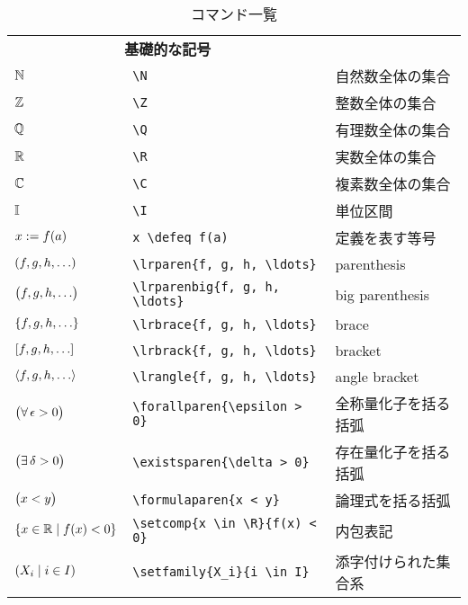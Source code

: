 \documentclass[uplatex, dvipdfmx, a4paper, 12pt, class=jsarticle, crop=false]{standalone}
\begin{document}
\newcommand{\tablesubtitle}[1]{\multicolumn{2}{c}{\textbf{#1}}}

\begin{table}[htb]
	\centering
	\renewcommand{\arraystretch}{0.9}
	\caption{コマンド一覧}
	\begin{tabular}{ll@{\qquad}l}
		\hline
		\hline

		\tablesubtitle{基礎的な記号} \\
		$\mathbb{N}$ & \verb|\N| & 自然数全体の集合 \\
		$\mathbb{Z}$ & \verb|\Z| & 整数全体の集合   \\
		$\mathbb{Q}$ & \verb|\Q| & 有理数全体の集合 \\
		$\mathbb{R}$ & \verb|\R| & 実数全体の集合   \\
		$\mathbb{C}$ & \verb|\C| & 複素数全体の集合 \\
		$\mathbb{I}$ & \verb|\I| & 単位区間         \\
		$x \mathrel{:=} f(a)$ & \verb|x \defeq f(a)| & 定義を表す等号 \\
		$\lrparen{f, g, h, \ldots}$    & \verb|\lrparen{f, g, h, \ldots}|    & parenthesis          \\
		$\bigl({f, g, h, \ldots}\bigr)$ & \verb|\lrparenbig{f, g, h, \ldots}| & big parenthesis      \\
		$\lrbrace{f, g, h, \ldots}$    & \verb|\lrbrace{f, g, h, \ldots}|    & brace                \\
		$\lrbrack{f, g, h, \ldots}$    & \verb|\lrbrack{f, g, h, \ldots}|    & bracket              \\
		$\lrangle{f, g, h, \ldots}$    & \verb|\lrangle{f, g, h, \ldots}|    & angle bracket        \\
		$\bigl({\forall\, \epsilon > 0}\bigr)$   & \verb|\forallparen{\epsilon > 0}|   & 全称量化子を括る括弧 \\
		$\bigl({\exists\, \delta > 0}\bigr)$     & \verb|\existsparen{\delta > 0}|     & 存在量化子を括る括弧 \\
		$\bigl({x < y}\bigr)$         & \verb|\formulaparen{x < y}|         & 論理式を括る括弧     \\
		$\setcomp{x \in \R}{f(x) < 0}$ & \verb|\setcomp{x \in \R}{f(x) < 0}| & 内包表記             \\
		$\setfamily{X_i}{i \in I}$     & \verb|\setfamily{X_i}{i \in I}|     & 添字付けられた集合系 \\
		\hline


\end{tabular}
\end{table}
\end{document}
